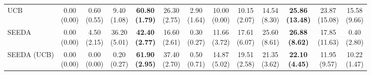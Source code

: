 \begin{table}[H]
{\begin{tabular}{l|cccccc|cccccc}
UCB & \makecell{0.00 \\ (0.00)} & \makecell{0.60 \\ (0.55)} & {\cellcolor[HTML]{C8E6C9}} \makecell{9.40 \\ (1.08)} & \bfseries \makecell{60.80 \\ (1.79)} & \makecell{26.30 \\ (2.75)} & \makecell{2.90 \\ (1.64)} & \makecell{10.00 \\ (0.00)} & \makecell{10.15 \\ (2.07)} & {\cellcolor[HTML]{C8E6C9}} \makecell{14.54 \\ (8.30)} & \bfseries \makecell{25.86 \\ (13.48)} & \makecell{23.87 \\ (15.08)} & \makecell{15.58 \\ (9.66)} \\
SEEDA & \makecell{0.00 \\ (0.00)} & \makecell{4.50 \\ (2.15)} & {\cellcolor[HTML]{C8E6C9}} \makecell{36.20 \\ (5.01)} & \bfseries \makecell{42.40 \\ (2.77)} & \makecell{16.60 \\ (2.61)} & \makecell{0.30 \\ (0.27)} & \makecell{11.66 \\ (3.72)} & \makecell{17.61 \\ (6.07)} & {\cellcolor[HTML]{C8E6C9}} \makecell{25.60 \\ (8.61)} & \bfseries \makecell{26.88 \\ (8.62)} & \makecell{17.85 \\ (11.63)} & \makecell{0.40 \\ (2.80)} \\
SEEDA (UCB) & \makecell{0.00 \\ (0.00)} & \makecell{0.00 \\ (0.00)} & {\cellcolor[HTML]{C8E6C9}} \makecell{0.20 \\ (0.27)} & \bfseries \makecell{61.90 \\ (2.95)} & \makecell{37.40 \\ (2.70)} & \makecell{0.50 \\ (0.71)} & \makecell{14.87 \\ (5.02)} & \makecell{19.51 \\ (2.58)} & {\cellcolor[HTML]{C8E6C9}} \makecell{21.35 \\ (3.62)} & \bfseries \makecell{22.10 \\ (4.45)} & \makecell{11.95 \\ (9.57)} & \makecell{10.22 \\ (1.47)} \\

\end{tabular}}
\end{table}
